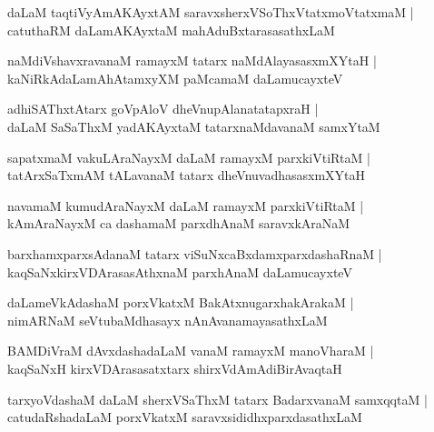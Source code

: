 \documentclass[twoside,12pt,openright]{book}
\newcounter{shloka}[chapter]
\begin{document}
\begin{shloka}%
daLaM taqtiVyAmAKAyxtAM saravxsherxVSoThxVtatxmoVtatxmaM |\\
catuthaRM daLamAKAyxtaM mahAduBxtarasasathxLaM 
\end{shloka}

\begin{shloka}%
naMdiVshavxravanaM ramayxM tatarx naMdAlayasasxmXYtaH |\\
kaNiRkAdaLamAhAtamxyXM paMcamaM daLamucayxteV 
\end{shloka}

\begin{shloka}%
adhiSAThxtAtarx goVpAloV dheVnupAlanatatapxraH |\\
daLaM SaSaThxM  yadAKAyxtaM tatarxnaMdavanaM samxYtaM 
\end{shloka}

\begin{shloka}%
sapatxmaM vakuLAraNayxM daLaM ramayxM parxkiVtiRtaM |\\
tatArxSaTxmAM tALavanaM tatarx dheVnuvadhasasxmXYtaH 
\end{shloka}

\begin{shloka}%
navamaM kumudAraNayxM daLaM ramayxM parxkiVtiRtaM |\\
kAmAraNayxM ca dashamaM parxdhAnaM saravxkAraNaM 
\end{shloka}

\begin{shloka}%
barxhamxparxsAdanaM tatarx viSuNxcaBxdamxparxdashaRnaM |\\
kaqSaNxkirxVDArasasAthxnaM parxhAnaM daLamucayxteV 
\end{shloka}

\begin{shloka}%
daLameVkAdashaM porxVkatxM BakAtxnugarxhakArakaM |\\
nimARNaM seVtubaMdhasayx nAnAvanamayasathxLaM 
\end{shloka}

\begin{shloka}%
BAMDiVraM dAvxdashadaLaM vanaM ramayxM manoVharaM |\\
kaqSaNxH kirxVDArasasatxtarx shirxVdAmAdiBirAvaqtaH
\end{shloka}

\begin{shloka}%
tarxyoVdashaM daLaM sherxVSaThxM tatarx BadarxvanaM samxqqtaM |\\
catudaRshadaLaM porxVkatxM saravxsididhxparxdasathxLaM 
\end{shloka}
\end{document}
